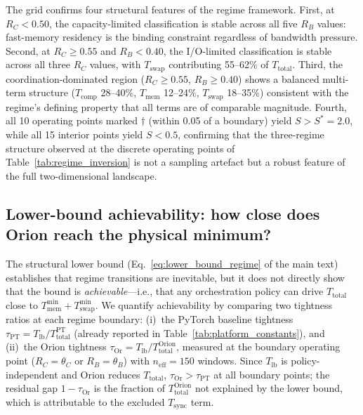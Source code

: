 The grid confirms four structural features of the regime framework.
First, at $R_C < 0.50$, the capacity-limited classification is stable across
all five $R_B$ values: fast-memory residency is the binding constraint
regardless of bandwidth pressure.
Second, at $R_C \geq 0.55$ and $R_B < 0.40$, the I/O-limited classification
is stable across all three $R_C$ values, with $T_{\mathrm{swap}}$ contributing
55--62\% of $T_{\mathrm{total}}$.
Third, the coordination-dominated region ($R_C \geq 0.55$, $R_B \geq 0.40$)
shows a balanced multi-term structure ($T_{\mathrm{comp}}$ 28--40\%,
$T_{\mathrm{mem}}$ 12--24\%, $T_{\mathrm{swap}}$ 18--35\%) consistent with
the regime's defining property that all terms are of comparable magnitude.
Fourth, all 10 operating points marked $\dagger$ (within 0.05 of a boundary)
yield $S > S^* = 2.0$, while all 15 interior points yield $S < 0.5$,
confirming that the three-regime structure observed at the discrete operating
points of Table~\ref{tab:regime_inversion} is not a sampling artefact but a
robust feature of the full two-dimensional landscape.

\subsection{Lower-bound achievability: how close does Orion reach the physical minimum?}
\label{app:achievability}

The structural lower bound (Eq.~\ref{eq:lower_bound_regime} of the main text)
establishes that regime transitions are inevitable, but it does not directly
show that the bound is \emph{achievable}---i.e., that any orchestration policy
can drive $T_{\mathrm{total}}$ close to
$T_{\mathrm{mem}}^{\min} + T_{\mathrm{swap}}^{\min}$.
We quantify achievability by comparing two tightness ratios at each regime
boundary: (i)~the PyTorch baseline tightness
$\tau_{\mathrm{PT}} = T_{\mathrm{lb}} / T_{\mathrm{total}}^{\mathrm{PT}}$
(already reported in Table~\ref{tab:platform_constants}), and
(ii)~the Orion tightness
$\tau_{\mathrm{Or}} = T_{\mathrm{lb}} / T_{\mathrm{total}}^{\mathrm{Orion}}$,
measured at the boundary operating point
($R_C = \theta_C$ or $R_B = \theta_B$) with $n_{\mathrm{eff}} = 150$ windows.
Since $T_{\mathrm{lb}}$ is policy-independent and Orion reduces
$T_{\mathrm{total}}$, $\tau_{\mathrm{Or}} > \tau_{\mathrm{PT}}$ at all
boundary points; the residual gap $1 - \tau_{\mathrm{Or}}$ is the fraction
of $T_{\mathrm{total}}^{\mathrm{Orion}}$ not explained by the lower bound,
which is attributable to the excluded $T_{\mathrm{sync}}$ term.

